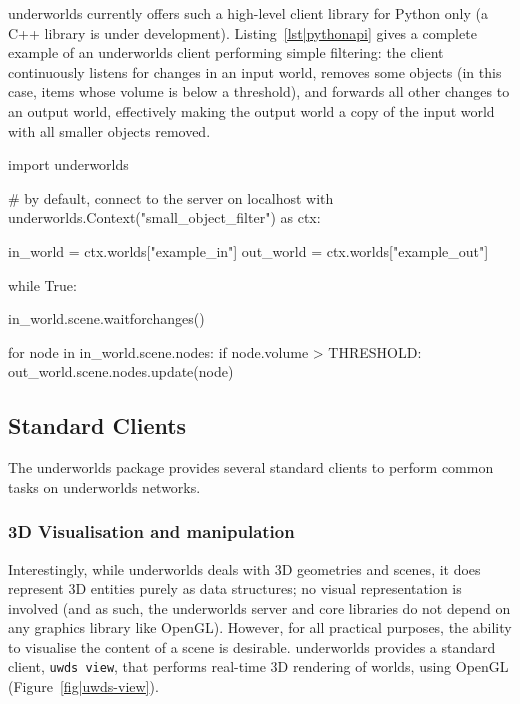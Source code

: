 \documentclass[conference]{IEEEtran}
\newcommand{\uwds}{{\sc underworlds}\xspace}
\begin{document}
\uwds currently offers such a high-level client library for Python only (a C++
library is under development).  Listing~\ref{lst|pythonapi} gives a complete
example of an \uwds client performing simple filtering: the client continuously
listens for changes in an input world, removes some objects (in this case, items
whose volume is below a threshold), and forwards all other changes to
an output world, effectively making the output world a copy of the input world
with all smaller objects removed.

\begin{listing}[h!]

\begin{pythoncode}
import underworlds

# by default, connect to the server on localhost
with underworlds.Context("small_object_filter") as ctx:

    in_world = ctx.worlds["example_in"]
    out_world = ctx.worlds["example_out"]

    while True:

        in_world.scene.waitforchanges()

        for node in in_world.scene.nodes:
            if node.volume > THRESHOLD:
                out_world.scene.nodes.update(node)


\end{pythoncode}
    \caption{Example of a simple yet complete \uwds filter, written in Python:
    the client connects to the \uwds network, blocks until the world {\tt
    example\_in} changes, and only propagate nodes that match the condition to
    the world {\tt example\_out}.}

    \label{lst|pythonapi}
\end{listing}

\subsection{Standard Clients}
\label{std_clients}

The \uwds package provides several standard clients to perform common tasks on
\uwds networks.

\subsubsection{3D Visualisation and manipulation}

Interestingly, while \uwds deals with 3D geometries and scenes, it does
represent 3D entities purely as data structures; no visual representation is
involved (and as such, the \uwds server and core libraries do not depend on any
graphics library like OpenGL). However, for all practical purposes, the ability
to visualise the content of a scene is desirable. \uwds provides a standard
client, {\tt uwds view}, that performs real-time 3D rendering of worlds,
using OpenGL (Figure~\ref{fig|uwds-view}).
\end{document}
